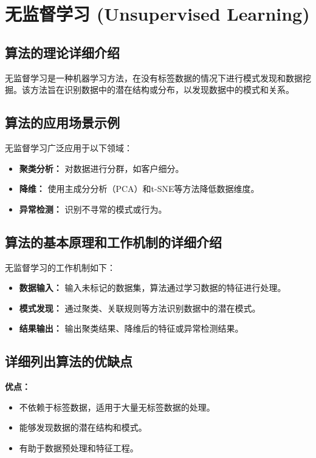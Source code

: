 \section{无监督学习 (Unsupervised Learning)}
\subsection*{算法的理论详细介绍}
无监督学习是一种机器学习方法，在没有标签数据的情况下进行模式发现和数据挖掘。该方法旨在识别数据中的潜在结构或分布，以发现数据中的模式和关系。

\subsection*{算法的应用场景示例}
无监督学习广泛应用于以下领域：
\begin{itemize}
    \item \textbf{聚类分析：} 对数据进行分群，如客户细分。
    \item \textbf{降维：} 使用主成分分析（PCA）和t-SNE等方法降低数据维度。
    \item \textbf{异常检测：} 识别不寻常的模式或行为。
\end{itemize}

\subsection*{算法的基本原理和工作机制的详细介绍}
无监督学习的工作机制如下：
\begin{itemize}
    \item \textbf{数据输入：} 输入未标记的数据集，算法通过学习数据的特征进行处理。
    \item \textbf{模式发现：} 通过聚类、关联规则等方法识别数据中的潜在模式。
    \item \textbf{结果输出：} 输出聚类结果、降维后的特征或异常检测结果。
\end{itemize}

\subsection*{详细列出算法的优缺点}
\textbf{优点：}
\begin{itemize}
    \item 不依赖于标签数据，适用于大量无标签数据的处理。
    \item 能够发现数据的潜在结构和模式。
    \item 有助于数据预处理和特征工程。
\end{itemize}

